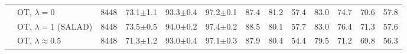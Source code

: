 \begin{table}[t]
\begin{tabular}{@{}llr ccc ccccccc@{}}
 & OT, $\lambda{=}0$ & 8448 & 73.1{\scriptsize$\pm$1.1} & 93.3{\scriptsize$\pm$0.4} & 97.2{\scriptsize$\pm$0.1} & 87.4 & 81.2 & 57.4 & 83.0 & 74.7 & 70.6 & 57.8 \\
 & OT, $\lambda{=}1$ (SALAD) & 8448 & 73.5{\scriptsize$\pm$0.5} & 94.0{\scriptsize$\pm$0.2} & 97.4{\scriptsize$\pm$0.2} & 88.5 & 80.1 & 57.7 & 83.0 & 76.4 & 71.3 & 57.6 \\
 & OT, $\lambda{\approx}0.5$ & 8448 & 71.3{\scriptsize$\pm$1.2} & 93.0{\scriptsize$\pm$0.4} & 97.1{\scriptsize$\pm$0.3} & 87.9 & 80.4 & 54.4 & 79.5 & 71.2 & 69.8 & 56.3 \\
\bottomrule
\end{tabular}
\end{table}